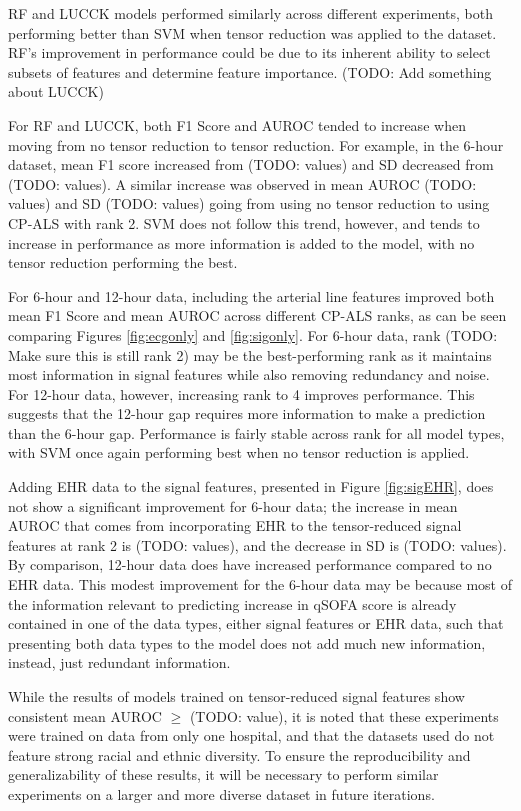 
RF and LUCCK models performed similarly across different experiments, both performing better than SVM when tensor reduction was applied to the dataset. RF's improvement in performance could be due to its inherent ability to select subsets of features and determine feature importance. (TODO: Add something about LUCCK)

For RF and LUCCK, both F1 Score and AUROC tended to increase when moving from no tensor reduction to tensor reduction. For example, in the 6-hour dataset, mean F1 score increased from (TODO: values) and SD decreased from (TODO: values). A similar increase was observed in mean AUROC (TODO: values) and SD (TODO: values) going from using no tensor reduction to using CP-ALS with rank 2. SVM does not follow this trend, however, and tends to increase in performance as more information is added to the model, with no tensor reduction performing the best.

For 6-hour and 12-hour data, including the arterial line features improved both mean F1 Score and mean AUROC across different CP-ALS ranks, as can be seen comparing Figures \ref{fig:ecgonly} and \ref{fig:sigonly}. For 6-hour data, rank (TODO: Make sure this is still rank 2) may be the best-performing rank as it maintains most information in signal features while also removing redundancy and noise. For 12-hour data, however, increasing rank to 4 improves performance. This suggests that the 12-hour gap requires more information to make a prediction than the 6-hour gap. Performance is fairly stable across rank for all model types, with SVM once again performing best when no tensor reduction is applied. 

Adding EHR data to the signal features, presented in Figure \ref{fig:sigEHR}, does not show a significant improvement for 6-hour data; the increase in mean AUROC that comes from incorporating EHR to the tensor-reduced signal features at rank 2 is (TODO: values), and the decrease in SD is (TODO: values). By comparison, 12-hour data does have increased performance compared to no EHR data. This modest improvement for the 6-hour data may be because most of the information relevant to predicting increase in qSOFA score is already contained in one of the data types, either signal features or EHR data, such that presenting both data types to the model does not add much new information, instead, just redundant information.

While the results of models trained on tensor-reduced signal features show consistent mean AUROC $\geq$ (TODO: value), it is noted that these experiments were trained on data from only one hospital, and that the datasets used do not feature strong racial and ethnic diversity. To ensure the reproducibility and generalizability of these results, it will be necessary to perform similar experiments on a larger and more diverse dataset in future iterations.


